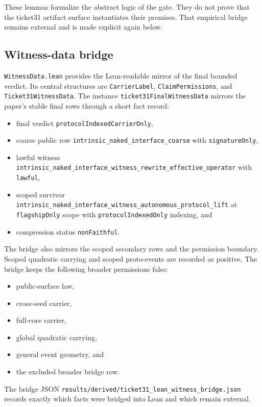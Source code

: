 \documentclass[11pt]{article}
\theoremstyle{definition}
\begin{document}
These lemmas formalize the abstract logic of the gate. They do not prove that the ticket31
artifact surface instantiates their premises. That empirical bridge remains external and is
made explicit again below.

\subsection{Witness-data bridge}

\nolinkurl{WitnessData.lean} provides the Lean-readable mirror of the final bounded verdict.
Its central structures are \texttt{CarrierLabel}, \texttt{ClaimPermissions}, and
\texttt{Ticket31WitnessData}. The instance \texttt{ticket31FinalWitnessData} mirrors the
paper's stable final rows through a short fact record:
\begin{itemize}[leftmargin=*]
\item final verdict \texttt{protocolIndexedCarrierOnly},
\item coarse public row \nolinkurl{intrinsic_naked_interface_coarse} with
\texttt{signatureOnly},
\item lawful witness
\nolinkurl{intrinsic_naked_interface_witness_rewrite_effective_operator} with
\texttt{lawful},
\item scoped survivor
\nolinkurl{intrinsic_naked_interface_witness_autonomous_protocol_lift} at
\texttt{flagshipOnly} scope with \texttt{protocolIndexedOnly} indexing, and
\item compression status \texttt{nonFaithful}.
\end{itemize}

The bridge also mirrors the scoped secondary rows and the permission boundary. Scoped
quadratic carrying and scoped proto-events are recorded as positive. The bridge keeps the
following broader permissions false:
\begin{itemize}[leftmargin=*]
\item public-surface law,
\item cross-seed carrier,
\item full-core carrier,
\item global quadratic carrying,
\item general event geometry, and
\item the excluded broader bridge row.
\end{itemize}
The bridge JSON \nolinkurl{results/derived/ticket31_lean_witness_bridge.json} records
exactly which facts were bridged into Lean and which remain external.
\end{document}
